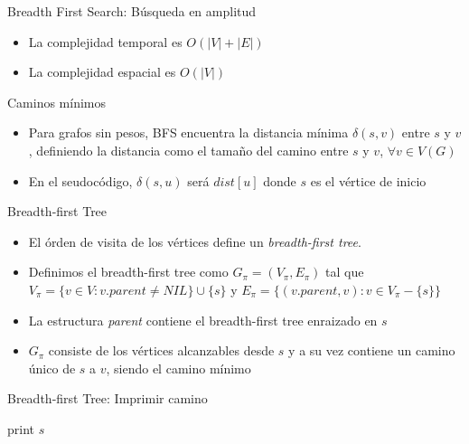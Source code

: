 \documentclass[]{beamer}
\begin{document}
\begin{frame}{Breadth First Search: B\'usqueda en amplitud}
  \begin{itemize}
    \item La complejidad temporal es $O(|V| + |E|)$
      \pause
    \item La complejidad espacial es $O(|V|)$
  \end{itemize}
\end{frame}

\begin{frame}{Caminos m\'inimos}
  \begin{itemize}
    \item Para grafos sin pesos, BFS encuentra la distancia m\'inima $\delta(s, v)$ entre $s$ y $v$, definiendo la distancia como el tama\~no del camino entre $s$ y $v$, $\forall v \in V(G)$
      \pause
    \item En el seudoc\'odigo, $\delta(s, u)$ ser\'a $dist[u]$ donde $s$ es el v\'ertice de inicio
  \end{itemize}
\end{frame}

\begin{frame}{Breadth-first Tree}
  \begin{itemize}
    \item El \'orden de visita de los v\'ertices define un \textit{breadth-first tree}. 
      \pause
    \item Definimos el breadth-first tree como $G_{\pi} = (V_{\pi}, E_{\pi})$ tal que $V_{\pi} = \{ v\in V : v.parent \neq NIL \} \cup \{s\}$ y $E_{\pi} = \{ (v.parent, v) : v\in V_{\pi} - \{s\} \}$
      \pause
    \item La estructura \textit{parent} contiene el breadth-first tree enraizado en $s$
      \pause
    \item $G_{\pi}$ consiste de los v\'ertices alcanzables desde $s$ y a su vez contiene un camino \'unico de $s$ a $v$, siendo el camino m\'inimo
  \end{itemize}
\end{frame}

\begin{frame}{Breadth-first Tree: Imprimir camino}
  \begin{algorithm}[H]
    {
      { print $s$ }
    } 
  \end{algorithm}
\end{frame}
\end{document}
